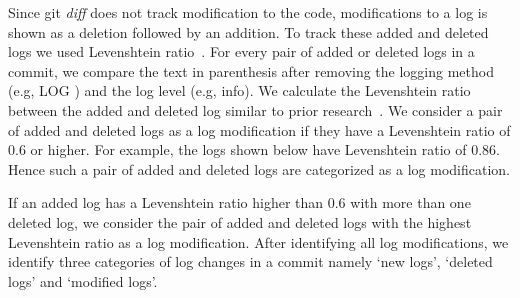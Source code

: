 Since git \textsl{diff} does not track modification to the code, modifications to a log is shown as a deletion followed by an addition. To track these added and deleted logs we used Levenshtein ratio~\cite{Levenshtein2}. For every pair of added or deleted logs in a commit, we compare the text in parenthesis after removing the logging method (e.g, LOG ) and the log level (e.g, info). We calculate the Levenshtein ratio between the added and deleted log similar to prior research~\cite{levenshteinratio}. We consider a pair of added and deleted logs as a log modification if they have a Levenshtein ratio of 0.6 or higher. For example, the logs shown below have Levenshtein ratio of 0.86. Hence such a pair of added and deleted logs are categorized as a log modification.  

If an added log has a Levenshtein ratio higher than 0.6 with more than one deleted log, we consider the pair of added and deleted logs with the highest Levenshtein ratio as a log modification. After identifying all log modifications, we identify three categories of log changes in a commit namely `new logs', `deleted logs' and `modified logs'.

